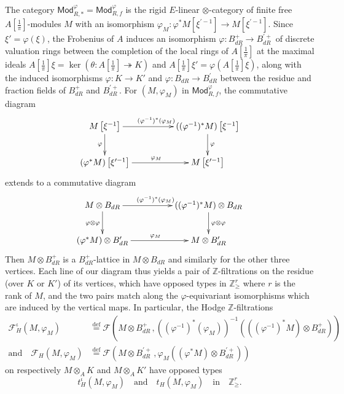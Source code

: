 \documentclass[11pt]{article}
\theoremstyle{definition}
\numberwithin{equation}{section}
\numberwithin{figure}{section}
\numberwithin{table}{section}
\newcommand{\Mod}{\mathsf{Mod}}
\newcommand{\eqd}{\stackrel{\mathrm{def}}{=}}
\newcommand*{\dR}{dR}
\begin{document}
The category $\Mod_{R,\ast}^{\varphi}=\Mod_{R,f}^{\varphi}$ is the rigid $E$-linear $\otimes$-category of finite free $A[\frac{1}{\pi}]$-modules $M$ with an isomorphism $\varphi_{M}:\varphi^{\ast}M[\xi^{\prime-1}]\rightarrow M[\xi^{\prime-1}]$. Since $\xi'=\varphi(\xi)$, the Frobenius of $A$ induces an isomorphism $\varphi:B_{\dR}^{+}\rightarrow B_{\dR}^{\prime+}$ of discrete valuation rings between the completion of the local rings of $A[\frac{1}{\pi}]$ at the maximal ideals $A[\frac{1}{\pi}]\xi=\ker(\theta:A[\frac{1}{\pi}]\twoheadrightarrow K)$ and $A[\frac{1}{\pi}]\xi'=\varphi(A[\frac{1}{\pi}]\xi)$, along with the induced isomorphisms $\varphi:K\rightarrow K'$ and $\varphi:B_{\dR}\rightarrow B_{\dR}^{\prime}$ between the residue and fraction fields of $B_{\dR}^{+}$ and $B_{\dR}^{\prime+}$. For $(M,\varphi_{M})$ in $\Mod_{R,f}^{\varphi}$, the commutative diagram
\[
\xymatrix@C=4pc{M\left[\xi^{-1}\right]\ar[d]_{\varphi}\ar[r]^{(\varphi^{-1})^{\ast}(\varphi_{M})} & ((\varphi^{-1})^{\ast}M)\left[\xi^{-1}\right]\ar[d]^{\varphi}\\
(\varphi^{\ast}M)\left[\xi^{\prime-1}\right]\ar[r]^{\varphi_{M}} & M\left[\xi^{\prime-1}\right] }
\]
extends to a commutative diagram
\[
\xymatrix@C=4pc{M\otimes B_{\dR}\ar[d]_{\varphi\otimes\varphi}\ar[r]^{(\varphi^{-1})^{\ast}(\varphi_{M})} & ((\varphi^{-1})^{\ast}M)\otimes B_{\dR}\ar[d]^{\varphi\otimes\varphi}\\
(\varphi^{\ast}M)\otimes B_{\dR}^{\prime}\ar[r]^{\varphi_{M}} & M\otimes B_{\dR}^{\prime} }
\]
Then $M\otimes B_{\dR}^{+}$ is a $B_{\dR}^{+}$-lattice in $M\otimes B_{\dR}$ and similarly for the other three vertices. Each line of our diagram thus yields a pair of $\mathbb{Z}$-filtrations on the residue (over $K$ or $K'$) of its vertices, which have opposed types in $\mathbb{Z}_{\geq}^{r}$ where $r$ is the rank of $M$, and the two pairs match along the $\varphi$-equivariant isomorphisms which are induced by the vertical maps. In particular, the Hodge $\mathbb{Z}$-filtrations
\begin{align*}
\mathcal{F}_{H}^{\iota}(M,\varphi_{M}) & \eqd \mathcal{F}\left(M\otimes B_{\dR}^{+}\,,\left((\varphi^{-1})^{\ast}(\varphi_{M})\right)^{-1}\left(\left((\varphi^{-1})^{\ast}M\right)\otimes B_{\dR}^{+}\right)\right)\\
\text{and}\quad\mathcal{F}_{H}(M,\varphi_{M}) & \eqd \mathcal{F}\left(M\otimes B_{\dR}^{\prime+}\,,\varphi_{M}\left((\varphi^{\ast}M)\otimes B_{\dR}^{\prime+}\right)\right)
\end{align*}
on respectively $M\otimes_{A}K$ and $M\otimes_{A}K'$ have opposed types
\[
t_{H}^{\iota}(M,\varphi_{M})\quad\text{and}\quad t_{H}(M,\varphi_{M})\quad\text{in}\quad\mathbb{Z}_{\geq}^{r}.
\]
\end{document}

